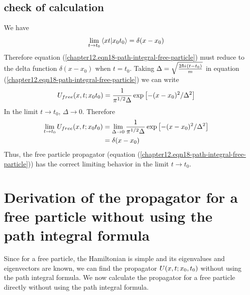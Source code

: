 	\subsection{check of calculation}
	We have
	\begin{equation}
		\lim\limits_{ t \rightarrow t_0} \braket{x t}{x_0 t_0} = \delta(x-x_0)
	\end{equation}
	Therefore equation (\ref{chapter12.eqn18-path-integral-free-particle}) must reduce to the delta function $\delta(x-x_0)$ when $t=t_0$. Taking $\Delta = \sqrt{\frac{2\hbar {i\mkern1mu} (t-t_0)}{m}}$ in equation (\ref{chapter12.eqn18-path-integral-free-particle}) we can write
	\begin{equation}
		U_{free}\qty(x, t; x_0 t_0) = \frac{1}{\pi^{1/2} \Delta} \exp\left[-(x-x_0)^2/\Delta^2\right]
	\end{equation}
	In the limit $t\rightarrow t_0$, $\Delta \rightarrow 0$. Therefore
	\begin{align}
		\lim\limits_{t\rightarrow t_0} U_{free}(x, t; x_0 t_0) &= \lim\limits_{\Delta \rightarrow 0} \frac{1}{\pi^{1/2} \Delta} \exp\left[-(x-x_0)^2 / \Delta^2\right] \\
		&= \delta\qty(x-x_0)
	\end{align}
	Thus, the free particle propagator (equation (\ref{chapter12.eqn18-path-integral-free-particle})) has the correct limiting behavior in the limit $t\rightarrow t_0$.
	
	\section{Derivation of the propagator for a free particle without using the path integral formula}
	Since for a free particle, the Hamiltonian is simple and its eigenvalues and eigenvectors are known, we can find the propagator $U\qty(x, t; x_0, t_0)$ without using the path integral formula. We now calculate the propagator for a free particle directly without using the path integral formula.\\
	
